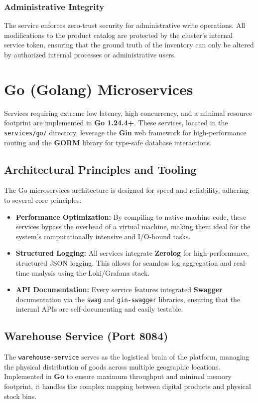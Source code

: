 \documentclass[12pt,a4paper]{report}
\begin{document}
\subsubsection{Administrative Integrity}
The service enforces zero-trust security for administrative write operations. All modifications to the product catalog are protected by the cluster's internal service token, ensuring that the ground truth of the inventory can only be altered by authorized internal processes or administrative users.


\section{Go (Golang) Microservices}
Services requiring extreme low latency, high concurrency, and a minimal resource footprint are implemented in \textbf{Go 1.24.4+}. These services, located in the \texttt{services/go/} directory, leverage the \textbf{Gin} web framework for high-performance routing and the \textbf{GORM} library for type-safe database interactions.

\subsection{Architectural Principles and Tooling}
The Go microservices architecture is designed for speed and reliability, adhering to several core principles:
\begin{itemize}
    \item \textbf{Performance Optimization:} By compiling to native machine code, these services bypass the overhead of a virtual machine, making them ideal for the system's computationally intensive and I/O-bound tasks.
    \item \textbf{Structured Logging:} All services integrate \textbf{Zerolog} for high-performance, structured JSON logging. This allows for seamless log aggregation and real-time analysis using the Loki/Grafana stack.
    \item \textbf{API Documentation:} Every service features integrated \textbf{Swagger} documentation via the \texttt{swag} and \texttt{gin-swagger} libraries, ensuring that the internal APIs are self-documenting and easily testable.
\end{itemize}

\subsection{Warehouse Service (Port 8084)}
The \texttt{warehouse-service} serves as the logistical brain of the platform, managing the physical distribution of goods across multiple geographic locations. Implemented in \textbf{Go} to ensure maximum throughput and minimal memory footprint, it handles the complex mapping between digital products and physical stock bins.
\end{document}
